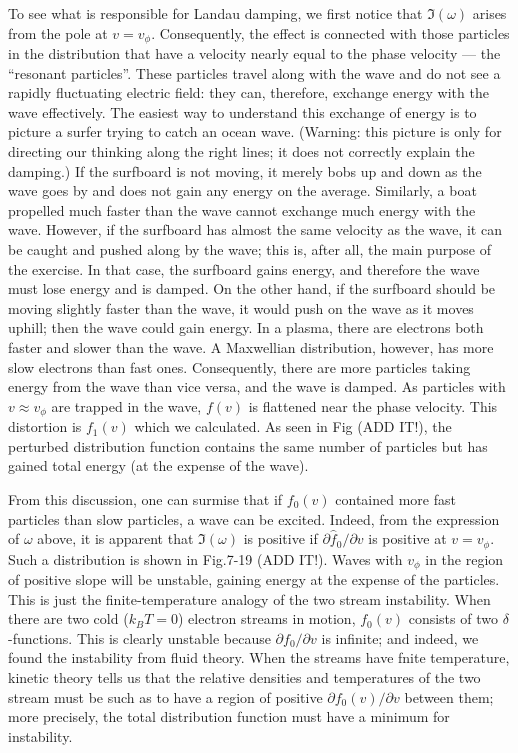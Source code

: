 \documentclass[
  notoc %
]{tufte-book}
\begin{document}
To see what is responsible for Landau damping, we first notice that
\(\Im(\omega)\) arises from the pole at \(v=v_\phi\). Consequently, the
effect is connected with those particles in the distribution that have a
velocity nearly equal to the phase velocity --- the ``resonant
particles''. These particles travel along with the wave and do not see a
rapidly fluctuating electric field: they can, therefore, exchange energy
with the wave effectively. The easiest way to understand this exchange
of energy is to picture a surfer trying to catch an ocean wave.
(Warning: this picture is only for directing our thinking along the
right lines; it does not correctly explain the damping.) If the
surfboard is not moving, it merely bobs up and down as the wave goes by
and does not gain any energy on the average. Similarly, a boat propelled
much faster than the wave cannot exchange much energy with the wave.
However, if the surfboard has almost the same velocity as the wave, it
can be caught and pushed along by the wave; this is, after all, the main
purpose of the exercise. In that case, the surfboard gains energy, and
therefore the wave must lose energy and is damped. On the other hand, if
the surfboard should be moving slightly faster than the wave, it would
push on the wave as it moves uphill; then the wave could gain energy. In
a plasma, there are electrons both faster and slower than the wave. A
Maxwellian distribution, however, has more slow electrons than fast
ones. Consequently, there are more particles taking energy from the wave
than vice versa, and the wave is damped. As particles with
\(v\approx v_\phi\) are trapped in the wave, \(f(v)\) is flattened near
the phase velocity. This distortion is \(f_1(v)\) which we calculated.
As seen in Fig (ADD IT!), the perturbed distribution function contains
the same number of particles but has gained total energy (at the expense
of the wave).

From this discussion, one can surmise that if \(f_0(v)\) contained more
fast particles than slow particles, a wave can be excited. Indeed, from
the expression of \(\omega\) above, it is apparent that \(\Im(\omega)\)
is positive if \(\partial\hat{f}_0/\partial v\) is positive at
\(v=v_\phi\). Such a distribution is shown in Fig.7-19 (ADD IT!). Waves
with \(v_\phi\) in the region of positive slope will be unstable,
gaining energy at the expense of the particles. This is just the
finite-temperature analogy of the two stream instability. When there are
two cold (\(k_B T=0\)) electron streams in motion, \(f_0(v)\) consists
of two \(\delta\)-functions. This is clearly unstable because
\(\partial f_0/\partial v\) is infinite; and indeed, we found the
instability from fluid theory. When the streams have fnite temperature,
kinetic theory tells us that the relative densities and temperatures of
the two stream must be such as to have a region of positive
\(\partial f_0(v)/\partial v\) between them; more precisely, the total
distribution function must have a minimum for instability.
\end{document}
